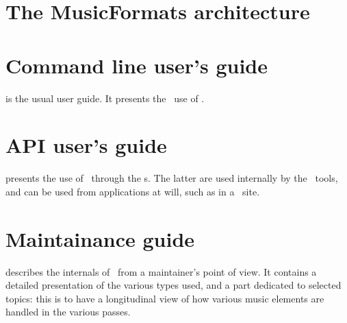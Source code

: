 \section{The MusicFormats architecture}


\section{Command line user's guide}

 is the usual user guide. It presents the \CLI\ use of \mf.


\section{API user's guide}

 presents the use of \mf\ through the \API s. The latter are used internally by the \CLI\ tools, and can be used from applications at will, such as in a \Web\ site.


\section{Maintainance guide}

 describes the internals of \mf\ from a maintainer's point of view. It contains a detailed presentation of the various types used, and a part dedicated to selected topics: this is to have a longitudinal view of how various music elements are handled in the various passes.

